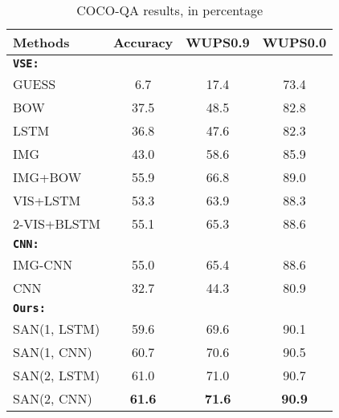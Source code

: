 \documentclass[10pt,twocolumn,letterpaper]{article}
\begin{document}
\begin{table}[!thbp]
  \vspace{-0.5cm}
\centering
  \begin{tabular}{l  c  c  c }
    \toprule
    Methods & Accuracy & WUPS0.9 &  WUPS0.0
    \\
    \midrule
    {\bf\texttt{VSE:}} \cite{ren2015imageqa} \\
    GUESS  & 6.7 & 17.4 & 73.4 \\
    BOW & 37.5 & 48.5 & 82.8 \\
    LSTM & 36.8 & 47.6 & 82.3 \\
    IMG & 43.0 & 58.6 & 85.9 \\
    IMG+BOW & 55.9 & 66.8 & 89.0 \\
    VIS+LSTM & 53.3 & 63.9 & 88.3 \\
    2-VIS+BLSTM & 55.1 & 65.3 & 88.6 \\
    \midrule
    {\bf \texttt{CNN:}} \cite{ma2015learning} \\
    IMG-CNN & 55.0 & 65.4 & 88.6 \\
    CNN & 32.7 & 44.3 & 80.9 \\
    \midrule
    {\bf \texttt{Ours:}} \\
    SAN(1, LSTM) & 59.6 & 69.6 & 90.1 \\
    SAN(1, CNN) & 60.7 & 70.6 & 90.5 \\
    SAN(2, LSTM) & 61.0 & 71.0 & 90.7 \\
    SAN(2, CNN) & {\bf 61.6} & {\bf 71.6} & {\bf 90.9} \\
    \bottomrule
  \end{tabular}
\caption{COCO-QA results, in percentage}
\label{tab:coco_results}
\end{table}
\end{document}
